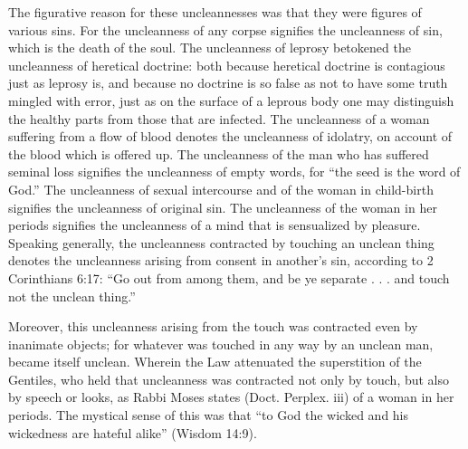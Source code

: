 The figurative reason for these uncleannesses was that they were figures of various sins. For the uncleanness of any corpse signifies the uncleanness of sin, which is the death of the soul. The uncleanness of leprosy betokened the uncleanness of heretical doctrine: both because heretical doctrine is contagious just as leprosy is, and because no doctrine is so false as not to have some truth mingled with error, just as on the surface of a leprous body one may distinguish the healthy parts from those that are infected. The uncleanness of a woman suffering from a flow of blood denotes the uncleanness of idolatry, on account of the blood which is offered up. The uncleanness of the man who has suffered seminal loss signifies the uncleanness of empty words, for ``the seed is the word of God.'' The uncleanness of sexual intercourse and of the woman in child-birth signifies the uncleanness of original sin. The uncleanness of the woman in her periods signifies the uncleanness of a mind that is sensualized by pleasure. Speaking generally, the uncleanness contracted by touching an unclean thing denotes the uncleanness arising from consent in another's sin, according to 2 Corinthians 6:17: ``Go out from among them, and be ye separate . . . and touch not the unclean thing.''

Moreover, this uncleanness arising from the touch was contracted even by inanimate objects; for whatever was touched in any way by an unclean man, became itself unclean. Wherein the Law attenuated the superstition of the Gentiles, who held that uncleanness was contracted not only by touch, but also by speech or looks, as Rabbi Moses states (Doct. Perplex. iii) of a woman in her periods. The mystical sense of this was that ``to God the wicked and his wickedness are hateful alike'' (Wisdom 14:9).

